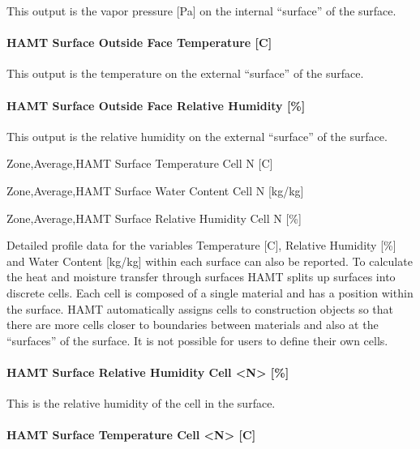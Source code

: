 This output is the vapor pressure {[}Pa{]} on the internal ``surface'' of the surface.

\paragraph{HAMT Surface Outside Face Temperature {[}C{]}}\label{hamt-surface-outside-face-temperature-c-2}

This output is the temperature on the external ``surface'' of the surface.

\paragraph{HAMT Surface Outside Face Relative Humidity {[}\%{]}}\label{hamt-surface-outside-face-relative-humidity-2}

This output is the relative humidity on the external ``surface'' of the surface.

Zone,Average,HAMT Surface Temperature Cell N {[}C{]}

Zone,Average,HAMT Surface Water Content Cell N {[}kg/kg{]}

Zone,Average,HAMT Surface Relative Humidity Cell N {[}\%{]}

Detailed profile data for the variables Temperature {[}C{]}, Relative Humidity {[}\%{]} and Water Content {[}kg/kg{]} within each surface can also be reported. To calculate the heat and moisture transfer through surfaces HAMT splits up surfaces into discrete cells. Each cell is composed of a single material and has a position within the surface. HAMT automatically assigns cells to construction objects so that there are more cells closer to boundaries between materials and also at the ``surfaces'' of the surface. It is not possible for users to define their own cells.

\paragraph{HAMT Surface Relative Humidity Cell \textless{}N\textgreater{} {[}\%{]}}\label{hamt-surface-relative-humidity-cell-n-2}

This is the relative humidity of the cell in the surface.

\paragraph{HAMT Surface Temperature Cell \textless{}N\textgreater{} {[}C{]}}\label{hamt-surface-temperature-cell-n-c-2}

